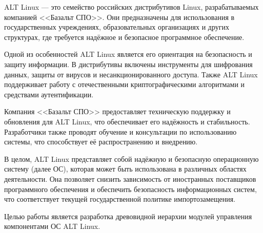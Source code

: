 \documentclass[bachelor, och, pract]{SCWorks}
\begin{document}


\tableofcontents






\intro

ALT Linux --- это семейство российских дистрибутивов Linux, разрабатываемых компанией <<Базальт СПО>>.
Они предназначены для использования в государственных учреждениях, образовательных организациях и других структурах, где требуется надёжное и безопасное программное обеспечение.

Одной из особенностей ALT Linux является его ориентация на безопасность и защиту информации.
В дистрибутивы включены инструменты для шифрования данных, защиты от вирусов и несанкционированного доступа.
Также ALT Linux поддерживает работу с отечественными криптографическими алгоритмами и средствами аутентификации.

Компания <<Базальт СПО>> предоставляет техническую поддержку и обновления для ALT Linux, что обеспечивает его надёжность и стабильность.
Разработчики также проводят обучение и консультации по использованию системы, что способствует её распространению и внедрению.

В целом, ALT Linux представляет собой надёжную и безопасную операционную систему (далее ОС), которая может быть использована в различных областях деятельности.
Она позволяет снизить зависимость от иностранных поставщиков программного обеспечения и обеспечить безопасность информационных систем\cite{a_basealt}, %
что соответствует текущей государственной политике импортозамещения.

Целью работы является разработка древовидной иерархии модулей управления компонентами ОС ALT Linux.
\end{document}
